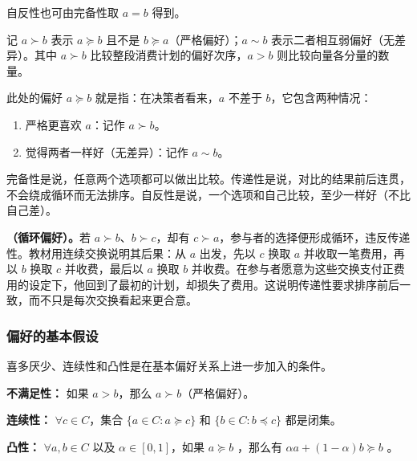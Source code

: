 自反性也可由完备性取 $a=b$ 得到。

\begin{tcolorbox}[knowledge,title=严格偏好与无差异的记号]
记 $a\succ b$ 表示 $a\succeq b$ 且不是 $b\succeq a$（严格偏好）；$a\sim b$ 表示二者相互弱偏好（无差异）。其中 $a\succ b$ 比较整段消费计划的偏好次序，$a>b$ 则比较向量各分量的数量。
\end{tcolorbox}


此处的偏好 $a\succeq b$ 就是指：在决策者看来，$a$ 不差于 $b$，它包含两种情况：
\begin{enumerate}
    \item 严格更喜欢 $a$：记作 $a\succ b$。
    \item 觉得两者一样好（无差异）：记作 $a\sim b$。
\end{enumerate}



完备性是说，任意两个选项都可以做出比较。传递性是说，对比的结果前后连贯，不会绕成循环而无法排序。自反性是说，一个选项和自己比较，至少一样好（不比自己差）。

\begin{tcolorbox}[example]
\textbf{（循环偏好）。}若 $a\succ b$、$b\succ c$，却有 $c\succ a$，参与者的选择便形成循环，违反传递性。教材用连续交换说明其后果：从 $a$ 出发，先以 $c$ 换取 $a$ 并收取一笔费用，再以 $b$ 换取 $c$ 并收费，最后以 $a$ 换取 $b$ 并收费。在参与者愿意为这些交换支付正费用的设定下，他回到了最初的计划，却损失了费用。这说明传递性要求排序前后一致，而不只是每次交换看起来更合意。
\end{tcolorbox}

\subsubsection{偏好的基本假设}
喜多厌少、连续性和凸性是在基本偏好关系上进一步加入的条件。

        \begin{tcolorbox}[knowledge]
\textbf{ 不满足性：} 如果 $a>b$，那么 $a\succ b$（严格偏好）。

        \textbf{ 连续性：} $\forall c \in C$，集合 $\{a\in C: a\succeq c\}$ 和 $\{b\in C: b\preceq c\}$ 都是闭集。

        \textbf{ 凸性：} $\forall a,b \in C$ 以及 $\alpha \in [0,1]$，如果 $a \succeq b$ ，那么有 $\alpha a+(1-\alpha)b\succeq b$ 。
\end{tcolorbox}

